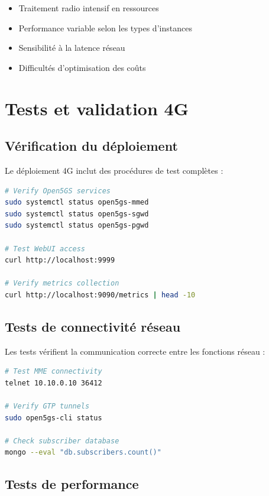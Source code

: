 \documentclass[12pt,a4paper]{report}
\begin{document}
\begin{itemize}
    \item Traitement radio intensif en ressources
    \item Performance variable selon les types d'instances
    \item Sensibilité à la latence réseau
    \item Difficultés d'optimisation des coûts
\end{itemize}

\section{Tests et validation 4G}

\subsection{Vérification du déploiement}

Le déploiement 4G inclut des procédures de test complètes :

\begin{lstlisting}[caption=Vérification du déploiement 4G, language=bash]
# Verify Open5GS services
sudo systemctl status open5gs-mmed
sudo systemctl status open5gs-sgwd
sudo systemctl status open5gs-pgwd

# Test WebUI access
curl http://localhost:9999

# Verify metrics collection
curl http://localhost:9090/metrics | head -10
\end{lstlisting}

\subsection{Tests de connectivité réseau}

Les tests vérifient la communication correcte entre les fonctions réseau :

\begin{lstlisting}[caption=Tests de connectivité 4G, language=bash]
# Test MME connectivity
telnet 10.10.0.10 36412

# Verify GTP tunnels
sudo open5gs-cli status

# Check subscriber database
mongo --eval "db.subscribers.count()"
\end{lstlisting}

\subsection{Tests de performance}
\end{document}
